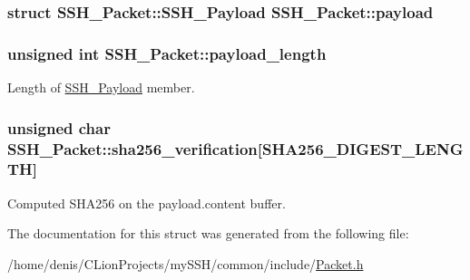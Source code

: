 \subsubsection[{\texorpdfstring{payload}{payload}}]{\setlength{\rightskip}{0pt plus 5cm}struct {\bf S\+S\+H\+\_\+\+Packet\+::\+S\+S\+H\+\_\+\+Payload}  S\+S\+H\+\_\+\+Packet\+::payload}\hypertarget{structSSH__Packet_a9a14fdf456e41d1e7b8ac7e98e2de83b}{}\label{structSSH__Packet_a9a14fdf456e41d1e7b8ac7e98e2de83b}
\subsubsection[{\texorpdfstring{payload\+\_\+length}{payload_length}}]{\setlength{\rightskip}{0pt plus 5cm}unsigned int S\+S\+H\+\_\+\+Packet\+::payload\+\_\+length}\hypertarget{structSSH__Packet_a53e4ab1ac5efa60989390c1966a7d3fb}{}\label{structSSH__Packet_a53e4ab1ac5efa60989390c1966a7d3fb}


Length of \hyperlink{structSSH__Packet_1_1SSH__Payload}{S\+S\+H\+\_\+\+Payload} member. 

\subsubsection[{\texorpdfstring{sha256\+\_\+verification}{sha256_verification}}]{\setlength{\rightskip}{0pt plus 5cm}unsigned char S\+S\+H\+\_\+\+Packet\+::sha256\+\_\+verification\mbox{[}S\+H\+A256\+\_\+\+D\+I\+G\+E\+S\+T\+\_\+\+L\+E\+N\+G\+TH\mbox{]}}\hypertarget{structSSH__Packet_a70c8dd74e6122753c751e92b5b697caf}{}\label{structSSH__Packet_a70c8dd74e6122753c751e92b5b697caf}


Computed S\+H\+A256 on the payload.\+content buffer. 



The documentation for this struct was generated from the following file\+:\begin{DoxyCompactItemize}
\item 
/home/denis/\+C\+Lion\+Projects/my\+S\+S\+H/common/include/\hyperlink{Packet_8h}{Packet.\+h}\end{DoxyCompactItemize}
